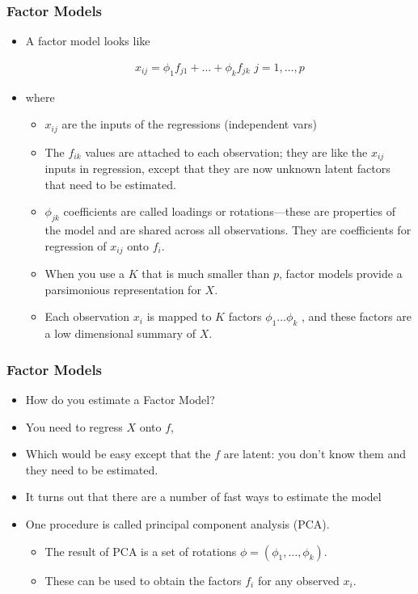 \documentclass[
  shownotes,
  xcolor={svgnames},
  hyperref={colorlinks,citecolor=DarkBlue,linkcolor=DarkRed,urlcolor=DarkBlue}
  , aspectratio=169]{beamer}
\begin{document}
\begin{frame}
\frametitle{Factor Models}

\begin{itemize}
\item A factor model looks like 

\begin{align}
x_{ij}=  \phi_{1} f_{j1} + \dots + \phi_{k} f_{jk} \,\, j=1,\dots,p
\end{align}

\item where 
  \begin{itemize}
   \item $x_{ij}$ are the inputs of the regressions (independent vars)
   \medskip
   \item The $f_{ik}$ values are attached to each observation; they are like the $x_{ij}$ inputs in regression, except that they are now unknown latent factors that need to be estimated.
  \medskip
   \item $\phi_{jk}$ coefficients are called loadings or rotations—these are properties of the model and are shared across all observations. They are coefficients for regression of $x_{ij}$ onto $f_i$.
  \medskip
   \item When you use a $K$ that is much smaller than $p$, factor models provide a parsimonious representation for $X$. 
   \medskip
   \item Each observation $x_i$ is mapped to $K$ factors $\phi_{1} \dots \phi_{k}$ , and these factors are a low dimensional summary of $X$.
  \end{itemize}


\end{itemize}
\end{frame}
\begin{frame}
\frametitle{Factor Models}

\begin{itemize}
\item How do you estimate a Factor Model?
\medskip
\item You need to regress $X$ onto $f$, 
\medskip
\pause
\item Which would be easy except that the $f$ are latent: you don’t know them and they need to be estimated. 
\medskip
\item It turns out that there are a number of fast ways to estimate the model
\medskip
\item One procedure is called principal component analysis (PCA). 
\medskip
\begin{itemize}
  \item The result of PCA is a set of rotations $\phi=(\phi_1,\dots,\phi_k)$. 
    \medskip
  \item These can be used to obtain the factors $f_i$ for any observed $x_i$.
\end{itemize}


\end{itemize}


\end{frame}
\end{document}
